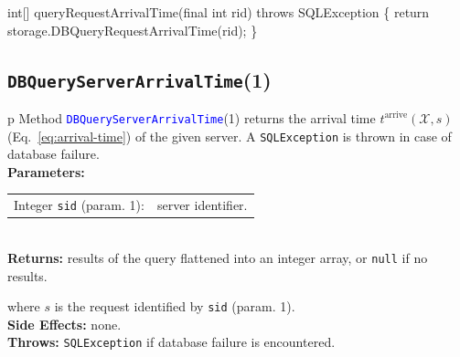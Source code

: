 \nwenddocs{}\endmoddef{}
int[] queryRequestArrivalTime(final int rid) throws SQLException \{
  return storage.DBQueryRequestArrivalTime(rid);
\}
\eatline
{}\nwendcode{}\nwdocspar
\subsection{\texttt{DBQueryServerArrivalTime}(1)}
\begin{tabular}{p{\textwidth}}
\toprule
{}
Method \textcolor{blue}{{\tt{}\protect{}DBQueryServerArrivalTime}}(1) returns the
arrival time $t^\textrm{arrive}(\mathcal{X},s)$
(Eq.~\ref{eq:arrival-time}) of the given server.
A {\tt{}SQLException} is thrown in case of database failure.\\
\midrule
\textbf{Parameters:}\\
\begin{tabular}{lp{116mm}}
Integer {\tt{}sid} (param. 1):&server identifier.
\end{tabular}\\
\textbf{Returns:} results of the query flattened into an integer array,
or {\tt{}null} if no results.


where $s$ is the request identified by {\tt{}sid} (param. 1).\\
\textbf{Side Effects:} none.\\
\textbf{Throws:} {\tt{}SQLException} if database failure is encountered.\\
\bottomrule
\end{tabular}
\nwenddocs{}\endmoddef{}
